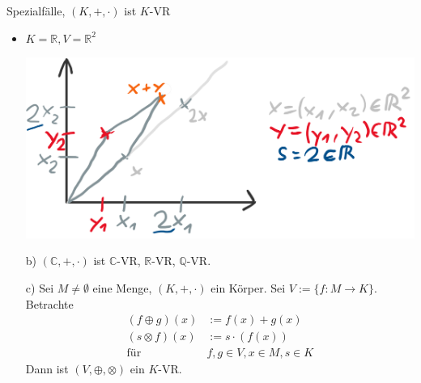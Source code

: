 \documentclass[a5paper, 10pt]{book}
\newcommand{\circleplus}{\oplus}%
\newcommand{\circlecdot}{\otimes}%
\begin{document}
					\pagebreak[3]
					Spezialfälle, $(K, +, \cdot)$ ist $K$-VR
					
					\begin{itemize}
						\item $K = \mathbb{R}, V = \mathbb{R}^2$
						\nopagebreak[4]
						\begin{center}
							\includegraphics[width=0.7\linewidth]{img/def7-1bsp}
						\end{center}
					\end{itemize}
				
					\begin{enumerate}
						\item[b)] $(\mathbb{C}, +, \cdot)$ ist $\mathbb{C}$-VR, $\mathbb{R}$-VR, $\mathbb{Q}$-VR.
						\item[c)] Sei $M \neq \emptyset$ eine Menge, $(K, +, \cdot)$ ein Körper. Sei $V:= \{f:M \to K\}$. Betrachte
							\begin{align}
								(f \circleplus g)(x) &:= f(x) + g(x)\\
								(s \circlecdot f)(x) &:= s \cdot (f(x))\\ \text{für }& f,g \in V, x \in M, s \in K
							\end{align}
							Dann ist $(V, \circleplus, \circlecdot)$ ein $K$-VR.
					\end{enumerate}
				
\end{document}
